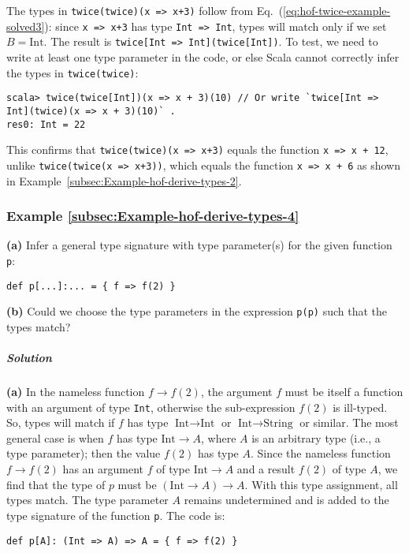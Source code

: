 The types in \lstinline!twice(twice)(x => x+3)! follow from Eq.~(\ref{eq:hof-twice-example-solved3}):
since \lstinline!x => x+3! has type \lstinline!Int => Int!, types
will match only if we set $B=\text{Int}$. The result is \lstinline!twice[Int => Int](twice[Int])!.
To test, we need to write at least one type parameter in the code,
or else Scala cannot correctly infer the types in \lstinline!twice(twice)!:
\begin{lstlisting}
scala> twice(twice[Int])(x => x + 3)(10) // Or write `twice[Int => Int](twice)(x => x + 3)(10)` .
res0: Int = 22
\end{lstlisting}
This confirms that \lstinline!twice(twice)(x => x+3)! equals the
function \lstinline!x => x + 12!, unlike \lstinline!twice(twice(x => x+3))!,
which equals the function \lstinline!x => x + 6! as shown in Example~\ref{subsec:Example-hof-derive-types-2}.

\subsubsection{Example \label{subsec:Example-hof-derive-types-4}\ref{subsec:Example-hof-derive-types-4}}

\textbf{(a)} Infer a general type signature with type parameter(s)
for the given function \lstinline!p!:
\begin{lstlisting}
def p[...]:... = { f => f(2) }
\end{lstlisting}
\textbf{(b)} Could we choose the type parameters in the expression
\lstinline!p(p)! such that the types match?

\subparagraph{Solution}

\textbf{(a)} In the nameless function $f\rightarrow f(2)$, the argument
$f$ must be itself a function with an argument of type \lstinline!Int!,
otherwise the sub-expression $f(2)$ is ill-typed. So, types will
match if $f$ has type $\text{Int}\rightarrow\text{Int}$ or $\text{Int}\rightarrow\text{String}$
or similar. The most general case is when $f$ has type $\text{Int}\rightarrow A$,
where $A$ is an arbitrary type (i.e., a type parameter); then the
value $f(2)$ has type $A$. Since the nameless function $f\rightarrow f(2)$
has an argument $f$ of type $\text{Int}\rightarrow A$ and a result
$f(2)$ of type $A$, we find that the type of $p$ must be $\left(\text{Int}\rightarrow A\right)\rightarrow A$.
With this type assignment, all types match. The type parameter $A$
remains undetermined and is added to the type signature of the function
\lstinline!p!. The code is:
\begin{lstlisting}
def p[A]: (Int => A) => A = { f => f(2) }
\end{lstlisting}

